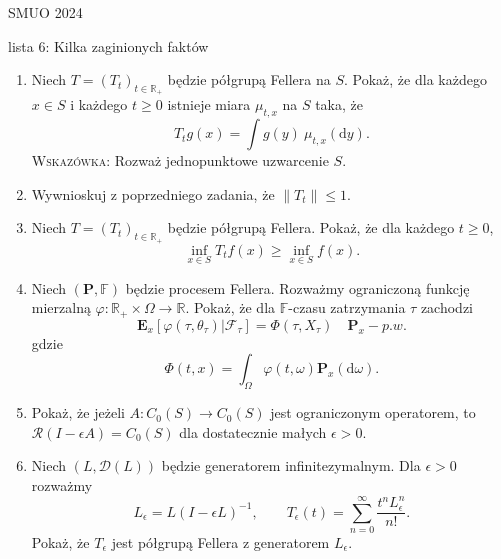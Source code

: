 \documentclass{article}
\begin{document}
SMUO 2024

lista 6: Kilka zaginionych faktów

\begin{enumerate}
	\item Niech $T = (T_{t})_{t \in \mathbb{R}_+}$ będzie półgrupą Fellera na $S$.
		Pokaż, że dla każdego $x \in S$ i każdego $t \geq 0$ istnieje miara $\mu_{t,x}$
		na $S$ taka, że
		\begin{equation*}
			T_tg(x) = \int g(y) \: \mu_{t,x}(\mathrm{d} y).
		\end{equation*}
		\textsc{Wskazówka}: Rozważ jednopunktowe uzwarcenie $S$.
	\item Wywnioskuj z poprzedniego zadania, że $\| T_t\|\leq 1$.
	\item Niech $T = (T_t)_{t \in \mathbb{R}_+}$ będzie półgrupą Fellera.
		Pokaż, że dla każdego $t \geq 0$,
		\begin{equation*}
			\inf_{x \in S} T_tf(x) \geq  
			\inf_{x \in S} f(x) .
		\end{equation*}
	\item Niech $(\mathbf{P}, \mathbb{F})$ będzie procesem Fellera. 
		Rozważmy ograniczoną funkcję mierzalną
		$\varphi \colon \mathbb{R}_+ \times \Omega \to \mathbb{R}$.
		Pokaż, że
		dla $\mathbb{F}$-czasu zatrzymania $\tau$ zachodzi
		\begin{equation*}
			\mathbf{E}_x \left[ \varphi(\tau, \theta_{\tau})  | \mathcal{F}_\tau\right] 
			= \Phi(\tau, X_{\tau}) \quad \mathbf{P}_x-p.w.
		\end{equation*}
		gdzie
		\begin{equation*}
			\Phi(t,x) = \int_\Omega \varphi(t, \omega) \mathbf{P}_x(\mathrm{d}\omega).
		\end{equation*}
	\item Pokaż, że jeżeli $A \colon C_0(S) \to C_0(S)$ jest ograniczonym operatorem,
		to $\mathcal{R}(I-\epsilon A) = C_0(S)$ dla dostatecznie małych $\epsilon>0$.
	\item Niech $(L, \mathcal{D}(L))$ będzie generatorem infinitezymalnym. Dla $\epsilon>0$ rozważmy
		\begin{equation*}
			L_\epsilon = L(I-\epsilon L)^{-1}, \qquad 
			T_\epsilon(t) = \sum_{n=0}^\infty \frac{t^nL_\epsilon^n}{n!}.
		\end{equation*}
		Pokaż, że $T_\epsilon$ jest półgrupą Fellera z generatorem $L_\epsilon$.
\end{enumerate}
\end{document}
